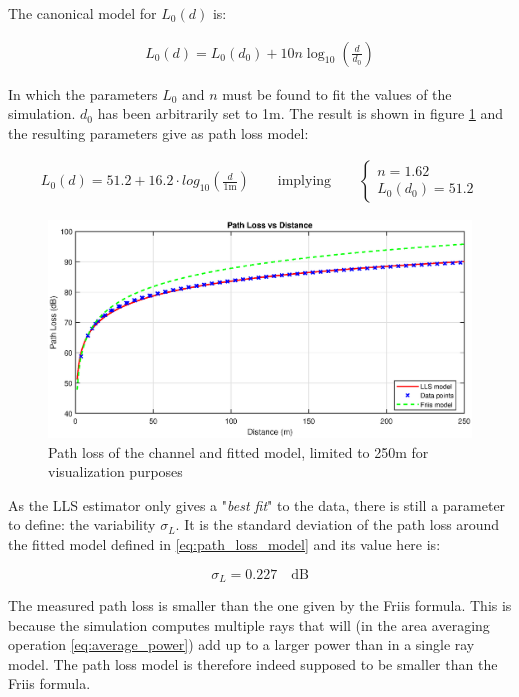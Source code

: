 \documentclass[10pt,a4paper]{ULBreport}
\begin{document}
The canonical model for $L_0(d)$ is:

\begin{align*}
    L_0(d) = L_0(d_0) + 10 n \log_{10} \left(\frac{d}{d_0}\right)
\end{align*}

In which the parameters $L_0$ and $n$ must be found to fit the values of the simulation. $d_0$ has been arbitrarily set to 1m. The result is shown in figure \ref{fig:path_loss} and the resulting parameters give as path loss model:

\begin{align}
    \label{eq:path_loss_model}
    L_0(d) = 51.2 + 16.2 \cdot log_{10} \left(\frac{d}{1\text{m}}\right)
    \qquad
    \text{implying} \qquad \left\{
    \begin{array}{l}
        n = 1.62 \\
        L_0(d_0) = 51.2
    \end{array}
    \right.
\end{align}

\begin{figure}[H]
    \centering
    \includegraphics[width=1\textwidth]{3_5_model.eps}
    \caption{Path loss of the channel and fitted model, limited to 250m for visualization purposes}
    \label{fig:path_loss}
\end{figure}

As the LLS estimator only gives a "\textit{best fit}" to the data, there is still a parameter to define: the variability $\sigma_L$. It is the standard deviation of the path loss around the fitted model defined in \ref{eq:path_loss_model} and its value here is:

\begin{equation*}
    \sigma_L = 0.227 \quad \text{dB}
\end{equation*}

The measured path loss is smaller than the one given by the Friis formula. This is because the simulation computes multiple rays that will (in the area averaging operation \ref{eq:average_power}) add up to a larger power than in a single ray model. The path loss model is therefore indeed supposed to be smaller than the Friis formula. \\
\end{document}
